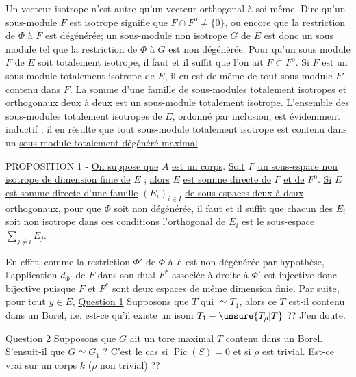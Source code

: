 Un vecteur isotrope n'est autre qu'un vecteur orthogonal à soi-même. Dire qu'un sous-module $F$ est isotrope signifie que $F\cap F^{\mathrm o}\ne\{0\}$, ou encore que la restriction de $\Phi$ à $F$ est dégénérée; un sous-module \uline{non isotrope} $G$ de $E$ est donc un sous module tel que la restriction de $\Phi$ à $G$ est non dégénérée. Pour qu'un sous module $F$ de $E$ soit totalement isotrope, il faut et il suffit que l'on ait $F\subset F^{\mathrm o}$. Si $F$ est un sous-module totalement isotrope de $E$, il en est de même de tout sous-module $F'$ contenu dans $F$. La somme d'une famille de sous-modules totalement isotropes et orthogonaux deux à deux est un sous-module totalement isotrope.
L'ensemble des sous-modules totalement isotropes de $E$, ordonné par inclusion, est évidemment inductif ; il en résulte que tout sous-module totalement isotrope est contenu dans un \uline{sous-module totalement dégénéré maximal}.

PROPOSITION 1 - \uline{On suppose que} $A$ \uline{est un corps}. \uline{Soit} $F$ \uline{un sous-espace non isotrope de dimension finie de} $E$ ; \uline{alors} $E$ \uline{est somme directe de} $F$ \uline{et de} $F^{\mathrm o}$. \uline{Si} $E$ \uline{est somme directe d'une famille} $(E_i)_{i\in I}$ \uline{de sous espaces deux à deux orthogonaux}, \uline{pour que} $\Phi$ \uline{soit non dégénérée}, \uline{il faut et il suffit que chacun des} $E_i$ \uline{soit non isotrope dans ces conditions l'orthogonal de} $E_i$ \uline{est le sous-espace} $\sum_{j\ne i}E_j$.

En effet, comme la restriction $\Phi'$ de $\Phi$ à $F$ est non dégénérée par hypothèse, l'application $d_{\Phi'}$ de $F$ dans son dual $F^*$ associée à droite à $\Phi'$ est injective donc bijective puisque $F$ et $F^*$ sont deux espaces de même dimension finie. Par suite, pour tout $y\in E$,
\uline{Question 1} Supposons que  $T$ qui  $\simeq T_1$, alors ce $T$ est-il contenu dans un Borel, i.e. est-ce qu'il existe un isom  $T_1-\unsure{T_\rho|T}$ ??
J'en doute.

\uline{Question 2} Supposons que  $G$ ait un  tore maximal $T$ contenu dans un Borel. S'ensuit-il que $G\simeq G_1$ ?   C'est le cas si $\operatorname{Pic}(S)=0$  et si $\rho$  est trivial. Est-ce vrai sur un corps $k$ ($\rho$ non trivial) ??

